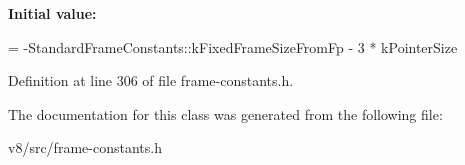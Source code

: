 {\bfseries Initial value\+:}
\begin{DoxyCode}
=
      -StandardFrameConstants::kFixedFrameSizeFromFp - 3 * kPointerSize
\end{DoxyCode}


Definition at line 306 of file frame-\/constants.\+h.



The documentation for this class was generated from the following file\+:\begin{DoxyCompactItemize}
\item 
v8/src/frame-\/constants.\+h\end{DoxyCompactItemize}
